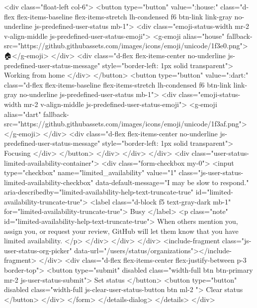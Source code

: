                   <div class="float-left col-6">
                      <button type="button" value=":house:" class="d-flex flex-items-baseline flex-items-stretch lh-condensed f6 btn-link link-gray no-underline js-predefined-user-status mb-1">
                        <div class="emoji-status-width mr-2 v-align-middle js-predefined-user-status-emoji">
                          <g-emoji alias="house" fallback-src="https://github.githubassets.com/images/icons/emoji/unicode/1f3e0.png">🏠</g-emoji>
                        </div>
                        <div class="d-flex flex-items-center no-underline js-predefined-user-status-message" style="border-left: 1px solid transparent">
                          Working from home
                        </div>
                      </button>
                      <button type="button" value=":dart:" class="d-flex flex-items-baseline flex-items-stretch lh-condensed f6 btn-link link-gray no-underline js-predefined-user-status mb-1">
                        <div class="emoji-status-width mr-2 v-align-middle js-predefined-user-status-emoji">
                          <g-emoji alias="dart" fallback-src="https://github.githubassets.com/images/icons/emoji/unicode/1f3af.png">🎯</g-emoji>
                        </div>
                        <div class="d-flex flex-items-center no-underline js-predefined-user-status-message" style="border-left: 1px solid transparent">
                          Focusing
                        </div>
                      </button>
                  </div>
              </div>
            </div>
            <div class="user-status-limited-availability-container">
              <div class="form-checkbox my-0">
                <input type="checkbox" name="limited_availability" value="1" class="js-user-status-limited-availability-checkbox" data-default-message="I may be slow to respond." aria-describedby="limited-availability-help-text-truncate-true" id="limited-availability-truncate-true">
                <label class="d-block f5 text-gray-dark mb-1" for="limited-availability-truncate-true">
                  Busy
                </label>
                <p class="note" id="limited-availability-help-text-truncate-true">
                  When others mention you, assign you, or request your review,
                  GitHub will let them know that you have limited availability.
                </p>
              </div>
            </div>
          </div>
          <include-fragment class="js-user-status-org-picker" data-url="/users/status/organizations"></include-fragment>
        </div>
        <div class="d-flex flex-items-center flex-justify-between p-3 border-top">
          <button type="submit" disabled class="width-full btn btn-primary mr-2 js-user-status-submit">
            Set status
          </button>
          <button type="button" disabled class="width-full js-clear-user-status-button btn ml-2 ">
            Clear status
          </button>
        </div>
</form>    </details-dialog>
  </details>
</div>

